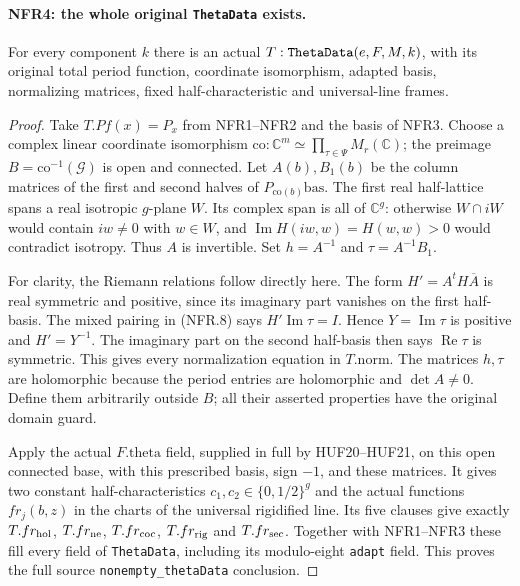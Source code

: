 \documentclass[11pt,a4paper]{article}
\numberwithin{equation}{section}
\theoremstyle{remark}\newtheorem{remark}[theorem]{Remark}
\begin{document}
\paragraph{NFR4: the whole original \texttt{Theta\allowbreak Data} exists.}
\label{claim:NFR4}
For every component $k$ there is an actual
$T:\texttt{Theta\allowbreak Data}(e,F,M,k)$, with its original total period
function, coordinate isomorphism, adapted basis, normalizing
matrices, fixed half-characteristic and universal-line frames.

\begin{proof}
Take $T.Pf(x)=P_x$ from NFR1--NFR2 and the basis of NFR3.
Choose a complex linear coordinate isomorphism
$\mathrm{co}:\mathbb C^m\simeq\prod_{\tau\in\Psi}M_r(\mathbb C)$;
the preimage $B=\mathrm{co}^{-1}(\mathcal G)$ is open and connected.
Let $A(b),B_1(b)$ be the column matrices of the first and second
halves of $P_{\mathrm{co}(b)}\mathrm{bas}$.
The first real half-lattice spans a real isotropic $g$-plane $W$.
Its complex span is all of $\mathbb C^g$: otherwise $W\cap iW$
would contain $iw\ne0$ with $w\in W$, and
$\operatorname{Im}H(iw,w)=H(w,w)>0$ would contradict isotropy.
Thus $A$ is invertible.  Set $h=A^{-1}$ and $\tau=A^{-1}B_1$.

For clarity, the Riemann relations follow directly here.
The form $H'=A^tH\overline A$ is real symmetric and positive,
since its imaginary part vanishes on the first half-basis.
The mixed pairing in (NFR.8) says
$H'\operatorname{Im}\tau=I$.  Hence $Y=\operatorname{Im}\tau$
is positive and $H'=Y^{-1}$.  The imaginary part on the second
half-basis then says $\operatorname{Re}\tau$ is symmetric.
This gives every normalization equation in $T.\mathrm{norm}$.
The matrices $h,\tau$ are holomorphic because the period entries
are holomorphic and $\det A\ne0$.  Define them arbitrarily outside
$B$; all their asserted properties have the original domain guard.

Apply the actual $F.\mathrm{theta}$ field, supplied in full by
HUF20--HUF21, on this open connected base, with this prescribed
basis, sign $-1$, and these matrices.  It gives two constant
half-characteristics $c_1,c_2\in\{0,1/2\}^g$ and the actual
functions $fr_j(b,z)$ in the charts of the universal rigidified
line.  Its five clauses give exactly $T.fr_{\rm hol}$,
$T.fr_{\rm ne}$, $T.fr_{\rm coc}$, $T.fr_{\rm rig}$ and
$T.fr_{\rm sec}$.  Together with NFR1--NFR3 these fill every
field of \texttt{Theta\allowbreak Data}, including its modulo-eight
\texttt{adapt} field.  This proves the full source
\texttt{nonempty\_\allowbreak theta\allowbreak Data} conclusion.
\end{proof}
\end{document}
